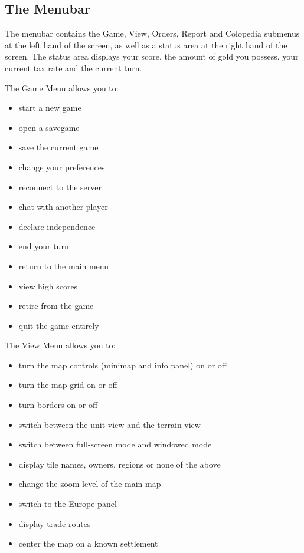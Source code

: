 \documentclass[12pt]{book}
\begin{document}
\hypertarget{menubar}{\subsection{The Menubar}}

The menubar contains the Game, View, Orders, Report and Colopedia
submenus at the left hand of the screen, as well as a status area at
the right hand of the screen. The status area displays your score, the
amount of gold you possess, your current tax rate and the current
turn.

The \hypertarget{game menu}{Game Menu} allows you to:

\begin{itemize}
\item start a new game 
\item open a savegame
\item save the current game
\item change your preferences
\item reconnect to the server
\item chat with another player
\item declare independence
\item end your turn
\item return to the main menu
\item view high scores
\item retire from the game
\item quit the game entirely
\end{itemize}

The \hypertarget{view menu}{View Menu} allows you to:

\begin{itemize}
\item turn the map controls (minimap and info panel) on or off
\item turn the map grid on or off
\item turn borders on or off
\item switch between the unit view and the terrain view
\item switch between full-screen mode and windowed mode
\item display tile names, owners, regions or none of the above
\item change the zoom level of the main map
\item switch to the Europe panel
\item display trade routes
\item center the map on a known settlement
\end{itemize}
\end{document}
